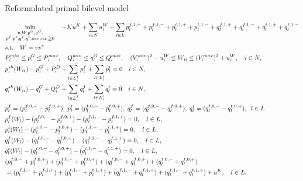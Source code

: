 \documentclass[xcolor=dvipsnames]{beamer}
\newcommand{\p}[1]{p^{#1}}
\newcommand{\q}[1]{q^{#1}}
\newcommand{\ii}{i}
\newcommand{\llll}{l}
\newcommand{\from}{f}
\newcommand{\tto}{t}
\newcommand{\WW}{W}
\newcommand{\Lines}{L}
\begin{document}
\begin{frame}{Reformulated primal bilevel model}
\begin{tiny}
\begin{subequations}
\begin{align}
&\min_{\substack{v,W,p^G,q^G,\\ p^f,p^t,q^f,q^t,u_W,u_K\geqq 0}} \quad 
  + Ku^K + \sum_{i \in N} u_i^W + \sum_{l \in L} p_{l}^{f,1,+} + p_{l}^{f,1,-} + p_{l}^{t,1,+} + p_{l}^{t,1,-} 
                 + q_{l}^{f,1,+} + q_{l}^{f,1,-} + q_{l}^{t,1,+} + q_{l}^{t,1,-} \notag \\
  & s.t. \quad W = v v^*  \notag \\
  & P_i^{min} \leq p_i^G \leq P_i^{max}, \quad Q_i^{min} \leq q_i^G \leq Q_i^{max}, \quad (V_i^{min})^2 -u_{\ii}^W \leq W_{ii} \leq (V_i^{max})^2 + u_{\ii}^W,\quad i \in N, \notag \\
  & p_i^{sh}(\WW_{ii}) - p^G_i + P^D_i 
	+ \sum_{\llll \in \Lines_\ii^{\from} } p_{l}^{f}  
	+\sum_{\llll \in \Lines_\ii^{\tto}   } p_{l}^{t} 
	= 0 \quad i\in N, \notag\\ 
  & q_i^{sh}(\WW_{ii}) - q^G_i + Q^D_i 
	+ \sum_{\llll \in \Lines_\ii^{\from}} q_{l}^{f}
	+ \sum_{\llll \in \Lines_\ii^{\tto} } q_{l}^{t} 
	=0 \quad i\in N, \notag \\
& p_l^f = (p_{l}^{f,0,-} - p_{l}^{f,0,+}),\; p_l^t=(p_{l}^{t,0,-} - p_{l}^{t,0,+}),\; q_l^f=(q_{l}^{f,0,-} - q_{l}^{f,0,+}),\; q_l^t=(q_{l}^{t,0,-} - q_{l}^{t,0,+}),\;\; l \in L \notag\\
& \p{\from}_{\llll}(\WW_\llll) - (p_{l}^{f,0,-} - p_{l}^{f,0,+}) - (p_{l}^{f,1,-} - p_{l}^{f,1,+}) = 0, \quad \llll \in L, \notag \\
& \p{\tto}_{\llll}(\WW_\llll)  - (p_{l}^{t,0,-} - p_{l}^{t,0,+}) - (p_{l}^{t,1,-} - p_{l}^{t,1,+}) = 0, \quad \llll \in L, \notag \\
& \q{\from}_{\llll}(\WW_\llll) - (q_{l}^{f,0,-} - q_{l}^{f,0,+}) - (q_{l}^{f,1,-} - q_{l}^{f,1,+}) = 0, \quad \llll \in L, \notag \\
& \q{\tto}_{\llll}(\WW_\llll)  - (q_{l}^{t,0,-} - q_{l}^{t,0,+}) - (q_{l}^{t,1,-} - q_{l}^{t,1,+}) = 0, \quad \llll \in L, \notag \\
&  (p_{l}^{f,0,-} + p_{l}^{f,0,+}) + (p_{l}^{t,0,-} + p_{l}^{t,0,+}) + (q_{l}^{f,0,-} + q_{l}^{f,0,+}) + (q_{l}^{t,0,-} + q_{l}^{t,0,+})  \notag \\
& =  (p_{l}^{f,1,-} + p_{l}^{f,1,+}) + (p_{l}^{t,1,-} + p_{l}^{t,1,+}) + (q_{l}^{f,1,-} + q_{l}^{f,1,+}) + (q_{l}^{t,1,-} + q_{l}^{t,1,+}) + u^K, \quad \llll \in L. \notag

\end{align}
\end{subequations}
\end{tiny}
\end{frame}
\end{document}
